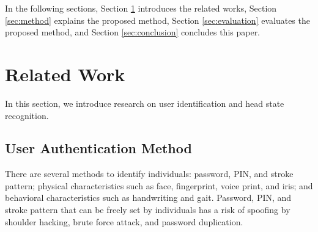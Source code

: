 \documentclass[sigchi,authordraft]{acmart}
\begin{document}
In the following sections, Section \ref{sec:related} introduces the related works, Section \ref{sec:method} explains the proposed method, Section \ref{sec:evaluation} evaluates the proposed method, and Section \ref{sec:conclusion} concludes this paper.


\section{Related Work}
\label{sec:related}
In this section, we introduce research on user identification and head state recognition.


\subsection{User Authentication Method}
There are several methods to identify individuals: password, PIN, and stroke pattern; physical characteristics such as face, fingerprint, voice print, and iris; and behavioral characteristics such as handwriting and gait. Password, PIN, and stroke pattern that can be freely set by individuals has a risk of spoofing by shoulder hacking, brute force attack, and password duplication.\par

\end{document}

